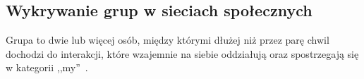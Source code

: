 \subsection{Wykrywanie grup w sieciach społecznych}
Grupa to dwie lub więcej osób, między którymi dłużej niż przez parę chwil 
dochodzi do interakcji, które wzajemnie na siebie oddziałują oraz spostrzegają
się w kategorii ,,my''~\cite[s.~268]{SocialPsychology}.

